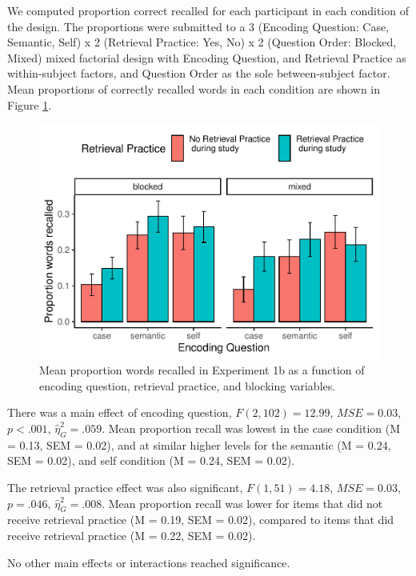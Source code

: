 \documentclass[
  man,floatsintext]{apa6}
\begin{document}
We computed proportion correct recalled for each participant in each condition of the design. The proportions were submitted to a 3 (Encoding Question: Case, Semantic, Self) x 2 (Retrieval Practice: Yes, No) x 2 (Question Order: Blocked, Mixed) mixed factorial design with Encoding Question, and Retrieval Practice as within-subject factors, and Question Order as the sole between-subject factor. Mean proportions of correctly recalled words in each condition are shown in Figure \ref{fig:E1Bresults}.

\begin{figure}
\centering
\includegraphics{Thesis_files/figure-latex/E1Bresults-1.pdf}
\caption{\label{fig:E1Bresults}Mean proportion words recalled in Experiment 1b as a function of encoding question, retrieval practice, and blocking variables.}
\end{figure}

There was a main effect of encoding question, \(F(2, 102) = 12.99\), \(\mathit{MSE} = 0.03\), \(p < .001\), \(\hat{\eta}^2_G = .059\). Mean proportion recall was lowest in the case condition (M = 0.13, SEM = 0.02), and at similar higher levels for the semantic (M = 0.24, SEM = 0.02), and self condition (M = 0.24, SEM = 0.02).

The retrieval practice effect was also significant, \(F(1, 51) = 4.18\), \(\mathit{MSE} = 0.03\), \(p = .046\), \(\hat{\eta}^2_G = .008\). Mean proportion recall was lower for items that did not receive retrieval practice (M = 0.19, SEM = 0.02), compared to items that did receive retrieval practice (M = 0.22, SEM = 0.02).

No other main effects or interactions reached significance.
\end{document}
